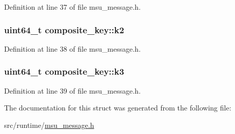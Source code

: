 Definition at line 37 of file msu\-\_\-message.\-h.

\hypertarget{structcomposite__key_acc0a164822bca688f71dfa2d2ef2f536}{
\subsubsection[{k2}]{\setlength{\rightskip}{0pt plus 5cm}uint64\-\_\-t composite\-\_\-key\-::k2}}\label{structcomposite__key_acc0a164822bca688f71dfa2d2ef2f536}


Definition at line 38 of file msu\-\_\-message.\-h.

\hypertarget{structcomposite__key_a6a97650be5bd7102fca8a17b82c88bb5}{
\subsubsection[{k3}]{\setlength{\rightskip}{0pt plus 5cm}uint64\-\_\-t composite\-\_\-key\-::k3}}\label{structcomposite__key_a6a97650be5bd7102fca8a17b82c88bb5}


Definition at line 39 of file msu\-\_\-message.\-h.



The documentation for this struct was generated from the following file\-:\begin{DoxyCompactItemize}
\item 
src/runtime/\hyperlink{msu__message_8h}{msu\-\_\-message.\-h}\end{DoxyCompactItemize}
